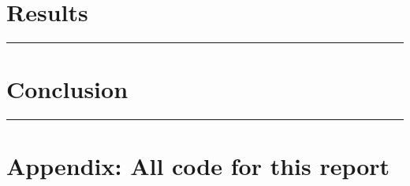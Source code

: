 \documentclass[
]{article}
\begin{document}
\newpage

\hypertarget{results}{%
\section{Results}\label{results}}

\begin{center}\rule{0.5\linewidth}{0.5pt}\end{center}

\newpage

\hypertarget{conclusion}{%
\section{Conclusion}\label{conclusion}}

\begin{center}\rule{0.5\linewidth}{0.5pt}\end{center}

\newpage

\hypertarget{appendix-all-code-for-this-report}{%
\section{Appendix: All code for this
report}\label{appendix-all-code-for-this-report}}
\end{document}
